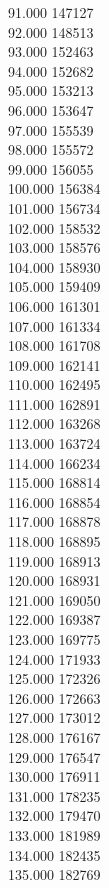 { 91.000	147127 \\
 92.000	148513 \\
 93.000	152463 \\
 94.000	152682 \\
 95.000	153213 \\
 96.000	153647 \\
 97.000	155539 \\
 98.000	155572 \\
 99.000	156055 \\
 100.000	156384 \\
 101.000	156734 \\
 102.000	158532 \\
 103.000	158576 \\
 104.000	158930 \\
 105.000	159409 \\
 106.000	161301 \\
 107.000	161334 \\
 108.000	161708 \\
 109.000	162141 \\
 110.000	162495 \\
 111.000	162891 \\
 112.000	163268 \\
 113.000	163724 \\
 114.000	166234 \\
 115.000	168814 \\
 116.000	168854 \\
 117.000	168878 \\
 118.000	168895 \\
 119.000	168913 \\
 120.000	168931 \\
 121.000	169050 \\
 122.000	169387 \\
 123.000	169775 \\
 124.000	171933 \\
 125.000	172326 \\
 126.000	172663 \\
 127.000	173012 \\
 128.000	176167 \\
 129.000	176547 \\
 130.000	176911 \\
 131.000	178235 \\
 132.000	179470 \\
 133.000	181989 \\
 134.000	182435 \\
 135.000	182769 \\
}
